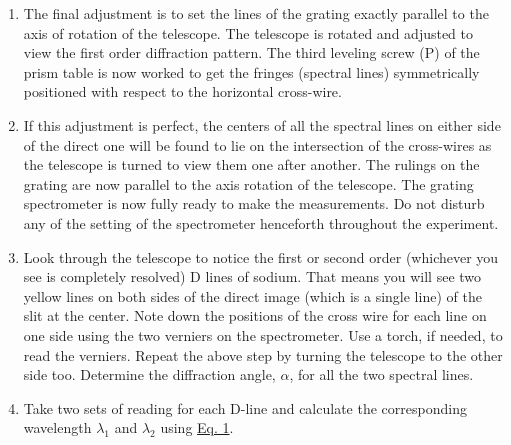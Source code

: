 \begin{enumerate}
	\item The final adjustment is to set the lines of the grating exactly parallel to the axis of rotation of the telescope. The telescope is rotated and adjusted to view the first order diffraction pattern. The third leveling screw (P) of the prism table is now worked to get the fringes (spectral lines) symmetrically positioned with respect to the horizontal cross-wire.
	\item If this adjustment is perfect, the centers of all the spectral lines on either side of the direct one will be found to lie on the intersection of the cross-wires as the telescope is turned to view them one after another. The rulings on the grating are now parallel to the axis rotation of the telescope. The grating spectrometer is now fully ready to make the measurements. Do not disturb any of the setting of the spectrometer henceforth throughout the experiment.
	\item  Look through the telescope to notice the first or second order (whichever you see is completely resolved) D lines of sodium. That means you will see two yellow lines on both sides of the direct image (which is a single line) of the slit at the center. Note down the positions of the cross wire for each line on one side using the two verniers on the spectrometer. Use a torch, if needed, to read the verniers. Repeat the above step by turning the telescope to the other side too. Determine the diffraction angle, $\alpha$, for all the two spectral lines.
	\item Take two sets of reading for each D-line and calculate the corresponding wavelength $\lambda_1$ and $\lambda_2$ using \hyperref[eqn:1]{Eq. 1}. 
\end{enumerate}